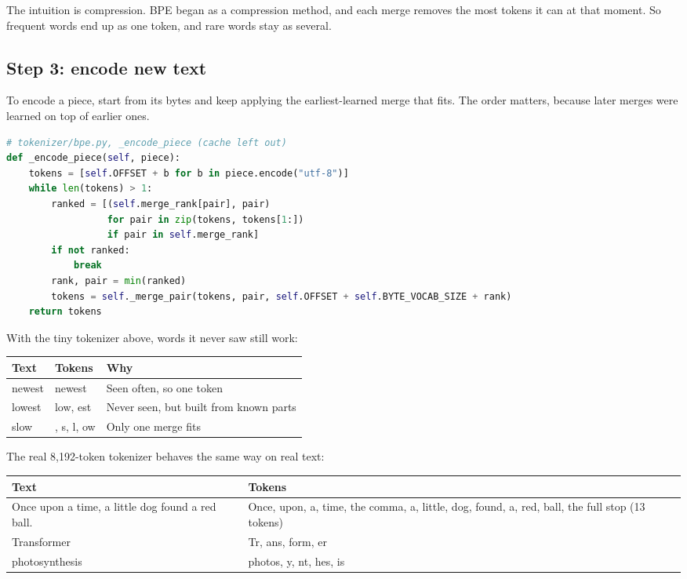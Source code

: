 \documentclass[11pt,a4paper]{article}
\newcommand{\vs}{\textvisiblespace}
\begin{document}
The intuition is compression. BPE began as a compression method, and each merge removes the most tokens it can at that moment. So frequent words end up as one token, and rare words stay as several.

\subsection*{Step 3: encode new text}
{}

To encode a piece, start from its bytes and keep applying the earliest-learned merge that fits. The order matters, because later merges were learned on top of earlier ones.

\begin{lstlisting}[language=Python]
# tokenizer/bpe.py, _encode_piece (cache left out)
def _encode_piece(self, piece):
    tokens = [self.OFFSET + b for b in piece.encode("utf-8")]
    while len(tokens) > 1:
        ranked = [(self.merge_rank[pair], pair)
                  for pair in zip(tokens, tokens[1:])
                  if pair in self.merge_rank]
        if not ranked:
            break
        rank, pair = min(ranked)
        tokens = self._merge_pair(tokens, pair, self.OFFSET + self.BYTE_VOCAB_SIZE + rank)
    return tokens
\end{lstlisting}

With the tiny tokenizer above, words it never saw still work:

{\small
\begin{longtable}{@{}>{\raggedright\arraybackslash}p{}>{\raggedright\arraybackslash}p{}>{\raggedright\arraybackslash}p{}@{}}
\toprule
\textbf{Text} & \textbf{Tokens} & \textbf{Why} \\
\midrule
\endhead
\vs{}newest & \vs{}newest & Seen often, so one token \\
\vs{}lowest & \vs{}low, est & Never seen, but built from known parts \\
\vs{}slow & \vs{}, s, l, ow & Only one merge fits \\
\bottomrule
\end{longtable}
}

The real 8,192-token tokenizer behaves the same way on real text:

{\small
\begin{longtable}{@{}>{\raggedright\arraybackslash}p{}>{\raggedright\arraybackslash}p{}@{}}
\toprule
\textbf{Text} & \textbf{Tokens} \\
\midrule
\endhead
Once upon a time, a little dog found a red ball. & Once, \vs{}upon, \vs{}a, \vs{}time, the comma, \vs{}a, \vs{}little, \vs{}dog, \vs{}found, \vs{}a, \vs{}red, \vs{}ball, the full stop (13 tokens) \\
\vs{}Transformer & \vs{}Tr, ans, form, er \\
\vs{}photosynthesis & \vs{}photos, y, nt, hes, is \\
\bottomrule
\end{longtable}
}
\end{document}
